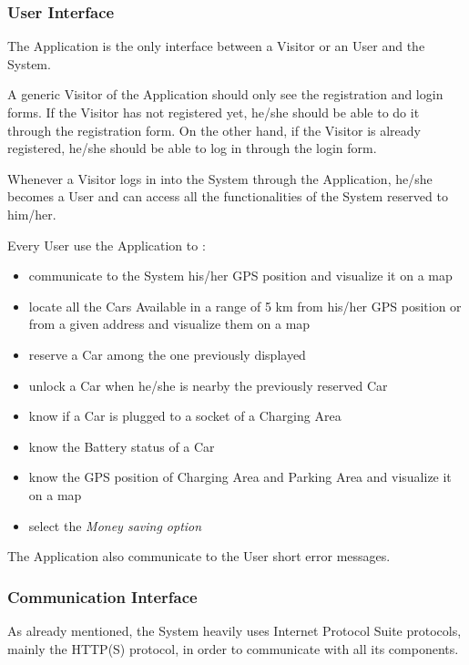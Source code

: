 \subsubsection{User Interface}
The Application is the only interface between a Visitor or an User and the System.

A generic Visitor of the Application should only see the registration and login forms. If the Visitor has not registered yet, he/she should be able to do it through the registration form. On the other hand, if the Visitor is already registered, he/she should be able to log in through the login form.

Whenever a Visitor logs in into the System through the Application, he/she becomes a User and can access all the functionalities of the System reserved to him/her.

Every User use the Application to :
\begin{itemize}
	\item communicate to the System his/her GPS position and visualize it on a map
	\item locate all the Cars Available in a range of 5 km from his/her GPS position or from a given address and visualize them on a map
	\item reserve a Car among the one previously displayed
	\item unlock a Car when he/she is nearby the previously reserved Car
	\item know if a Car is plugged to a socket of a Charging Area
	\item know the Battery status of a Car
	\item know the GPS position of Charging Area and Parking Area and visualize it on a map	
	\item select the \textit{Money saving option}
\end{itemize}

The Application also communicate to the User short error messages.

\subsubsection{Communication Interface}
As already mentioned, the System heavily uses Internet Protocol Suite protocols, mainly the HTTP(S) protocol, in order to communicate with all its components.